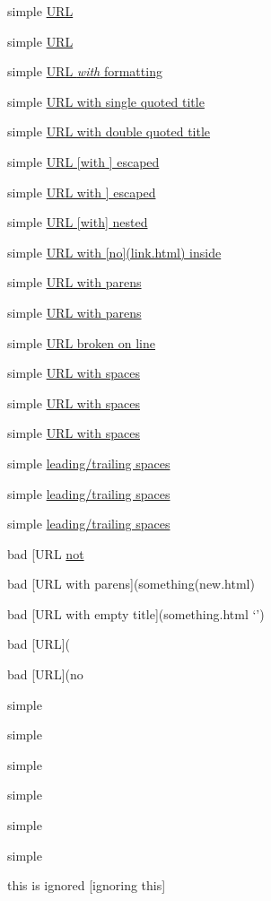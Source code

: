 simple \href{}{URL}

simple \href{something.html}{URL}

simple \href{something.html}{URL \emph{with} formatting}

simple \href{something.html}{URL with single quoted title}

simple \href{something.html}{URL with double quoted title}

simple \href{something.html}{URL [with ] escaped}

simple \href{something.html}{URL with ] escaped}

simple \href{something.html}{URL [with] nested}

simple \href{something.html}{URL with [no](link.html) inside}

simple \href{/something/to(do)}{URL with parens}

simple \href{/something/to(do}{URL with parens}

simple \href{something.html}{URL broken
on line}

simple \href{with spaces.html}{URL with spaces}

simple \href{with spaces.html}{URL with spaces}

simple \href{with (spaces).html}{URL with spaces}

simple \href{spaces.html}{leading/trailing spaces}

simple \href{spaces.html}{leading/trailing spaces}

simple \href{spaces.html}{leading/trailing spaces}

bad [URL \href{something.html}{not}

bad [URL with parens](something(new.html)

bad [URL with empty title](something.html `{}')

bad [URL](

bad [URL](no

simple 

simple 

simple 

simple 

simple 

simple 

this is ignored [ignoring this]

